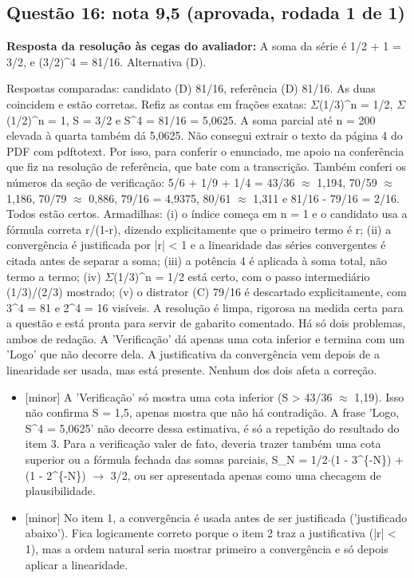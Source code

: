 \documentclass{article}%
\begin{document}
\subsection*{Questão 16: nota 9,5 (aprovada, rodada 1 de 1)}%
\textbf{Resposta da resolução às cegas do avaliador:} A soma da série é 1/2 + 1 = 3/2, e (3/2)\^{}4 = 81/16. Alternativa (D).\par %
Respostas comparadas: candidato (D) 81/16, referência (D) 81/16. As duas coincidem e estão corretas. Refiz as contas em frações exatas: $\Sigma$(1/3)\^{}n = 1/2, $\Sigma$(1/2)\^{}n = 1, S = 3/2 e S\^{}4 = 81/16 = 5,0625. A soma parcial até n = 200 elevada à quarta também dá 5,0625. Não consegui extrair o texto da página 4 do PDF com pdftotext. Por isso, para conferir o enunciado, me apoio na conferência que fiz na resolução de referência, que bate com a transcrição. Também conferi os números da seção de verificação: 5/6 + 1/9 + 1/4 = 43/36 $\approx$ 1,194, 70/59 $\approx$ 1,186, 70/79 $\approx$ 0,886, 79/16 = 4,9375, 80/61 $\approx$ 1,311 e 81/16 - 79/16 = 2/16. Todos estão certos. Armadilhas: (i) o índice começa em n = 1 e o candidato usa a fórmula correta r/(1-r), dizendo explicitamente que o primeiro termo é r; (ii) a convergência é justificada por |r| < 1 e a linearidade das séries convergentes é citada antes de separar a soma; (iii) a potência 4 é aplicada à soma total, não termo a termo; (iv) $\Sigma$(1/3)\^{}n = 1/2 está certo, com o passo intermediário (1/3)/(2/3) mostrado; (v) o distrator (C) 79/16 é descartado explicitamente, com 3\^{}4 = 81 e 2\^{}4 = 16 visíveis. A resolução é limpa, rigorosa na medida certa para a questão e está pronta para servir de gabarito comentado. Há só dois problemas, ambos de redação. A 'Verificação' dá apenas uma cota inferior e termina com um 'Logo' que não decorre dela. A justificativa da convergência vem depois de a linearidade ser usada, mas está presente. Nenhum dos dois afeta a correção.%
\begin{itemize}%
\item%
{[}minor{]} A 'Verificação' só mostra uma cota inferior (S > 43/36 $\approx$ 1,19). Isso não confirma S = 1,5, apenas mostra que não há contradição. A frase 'Logo, S\^{}4 = 5,0625' não decorre dessa estimativa, é só a repetição do resultado do item 3. Para a verificação valer de fato, deveria trazer também uma cota superior ou a fórmula fechada das somas parciais, S\_N = 1/2$\cdot$(1 - 3\^{}\{-N\}) + (1 - 2\^{}\{-N\}) $\to$ 3/2, ou ser apresentada apenas como uma checagem de plausibilidade.%
\item%
{[}minor{]} No item 1, a convergência é usada antes de ser justificada ('justificado abaixo'). Fica logicamente correto porque o item 2 traz a justificativa (|r| < 1), mas a ordem natural seria mostrar primeiro a convergência e só depois aplicar a linearidade.%
\end{itemize}%
\end{document}
